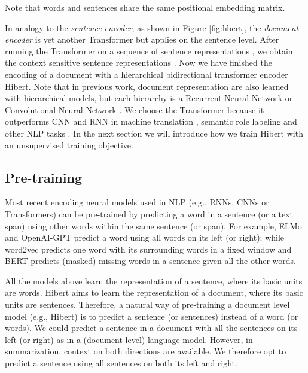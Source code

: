 \documentclass[11pt,a4paper]{article}
\begin{document}
Note that words and sentences share the same positional embedding matrix. 

In analogy to the \emph{sentence encoder}, as shown in Figure \ref{fig:hbert}, the \emph{document encoder} is yet another Transformer but applies on the sentence level. After running the Transformer on a sequence of sentence representations , we obtain the context sensitive sentence representations . Now we have finished the encoding of a document with a hierarchical bidirectional transformer encoder {\sc Hibert}. Note that in previous work, document representation are also learned with hierarchical models, but each hierarchy is a Recurrent Neural Network \cite{nallapati:2017:aaai,zhou:2018:acl} or Convolutional Neural Network \cite{cheng:2016:acl}. We choose the Transformer because it outperforms CNN and RNN in machine translation \cite{vaswani:2017:nips}, semantic role labeling \cite{strubell:2018:emnlp} and other NLP tasks \cite{devlin:2018:arxiv}. In the next section we will introduce how we train {\sc Hibert} with an unsupervised training objective.

\subsection{Pre-training}
\label{sec:pretrain}
Most recent encoding neural models used in NLP (e.g., RNNs, CNNs or Transformers) can be pre-trained by  predicting a word in a sentence (or a text span) using other words within the same sentence (or span). For example, ELMo \cite{peters:2018:naacl} and OpenAI-GPT \cite{radford:2018:nips} predict a word using all words on its left (or right); while word2vec \cite{mikolov:2013:nips} predicts one word with its surrounding words in a fixed window and BERT \cite{devlin:2018:arxiv} predicts (masked) missing words in a sentence given all the other words.

All the models above learn the representation of a sentence, where its basic units are words. \mbox{{\sc Hibert}} aims to learn the representation of a document, where its basic units are sentences. Therefore, a natural way of pre-training a document level model (e.g., {\sc Hibert}) is to predict a sentence (or sentences) instead of a word (or words). We could predict a sentence in a document with all the sentences on its left (or right) as in a (document level) language model. However, in summarization, context on both directions are available. We therefore opt to predict a sentence using all sentences on both its left and right. 
\end{document}
